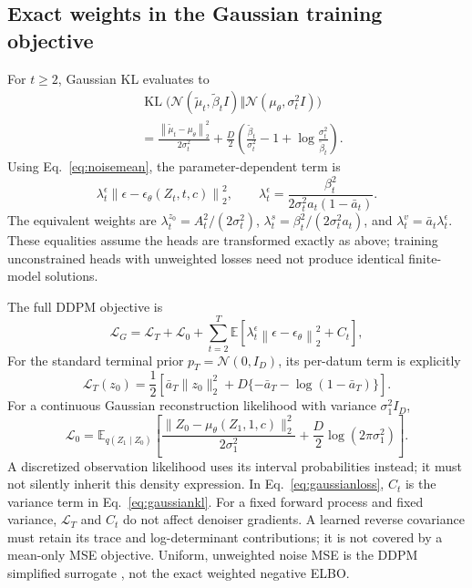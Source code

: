 \documentclass{article}
\theoremstyle{remark}\newtheorem{remark}[theorem]{Remark}
\newcommand{\E}{\mathbb E}
\newcommand{\KL}{\operatorname{KL}}
\newcommand{\norm}[1]{\left\lVert #1\right\rVert}
\begin{document}
\subsection{Exact weights in the Gaussian training objective}
For $t\ge2$, Gaussian KL evaluates to
\begin{align}
 &\KL\bigl(\mathcal N(\widetilde\mu_t,\widetilde\beta_tI)
 \Vert\mathcal N(\mu_\theta,\sigma_t^2I)\bigr)\nonumber\\
 &=\frac{\norm{\widetilde\mu_t-\mu_\theta}_2^2}{2\sigma_t^2}
 +\frac D2\left(\frac{\widetilde\beta_t}{\sigma_t^2}-1+
 \log\frac{\sigma_t^2}{\widetilde\beta_t}\right).
 \label{eq:gaussiankl}
\end{align}
Using Eq.~\eqref{eq:noisemean}, the parameter-dependent term is
\begin{equation}
 \lambda_t^{\epsilon}\norm{\epsilon-\epsilon_\theta(Z_t,t,c)}_2^2,
 \qquad
 \lambda_t^{\epsilon}=\frac{\beta_t^2}{2\sigma_t^2a_t(1-\bar a_t)}.
 \label{eq:ddpmweight}
\end{equation}
The equivalent weights are $\lambda_t^{z_0}=A_t^2/(2\sigma_t^2)$,
$\lambda_t^s=\beta_t^2/(2\sigma_t^2a_t)$, and
$\lambda_t^v=\bar a_t\lambda_t^\epsilon$. These equalities assume the heads are transformed exactly as above; training unconstrained heads with unweighted losses need not produce identical finite-model solutions.

The full DDPM objective is
\begin{equation}
 \mathcal L_G=\mathcal L_T+\mathcal L_0+
 \sum_{t=2}^T\E[\lambda_t^\epsilon\norm{\epsilon-\epsilon_\theta}_2^2+C_t],
 \label{eq:gaussianloss}
\end{equation}
For the standard terminal prior $p_T=\mathcal N(0,I_D)$, its per-datum term is explicitly
\begin{equation}
 \mathcal L_T(z_0)=\frac12\left[\bar a_T\|z_0\|_2^2+
 D\{-\bar a_T-\log(1-\bar a_T)\}\right].
 \label{eq:terminalgaussian}
\end{equation}
For a continuous Gaussian reconstruction likelihood with variance $\sigma_1^2I_D$,
\begin{equation}
 \mathcal L_0=\E_{q(Z_1\mid Z_0)}
 \left[\frac{\|Z_0-\mu_\theta(Z_1,1,c)\|_2^2}{2\sigma_1^2}
 +\frac D2\log(2\pi\sigma_1^2)\right].
 \label{eq:gaussianreconstruction}
\end{equation}
A discretized observation likelihood uses its interval probabilities instead; it must not silently inherit this density expression.
In Eq.~\eqref{eq:gaussianloss}, $C_t$ is the variance term in Eq.~\eqref{eq:gaussiankl}. For a fixed forward process and fixed variance, $\mathcal L_T$ and $C_t$ do not affect denoiser gradients. A learned reverse covariance must retain its trace and log-determinant contributions; it is not covered by a mean-only MSE objective. Uniform, unweighted noise MSE is the DDPM simplified surrogate \cite{ddpm}, not the exact weighted negative ELBO.
\end{document}
